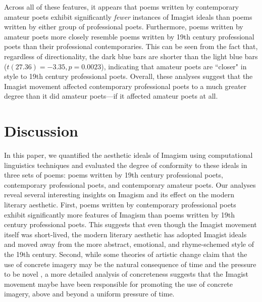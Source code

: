 \documentclass{book}
\begin{document}
Across all of these features, it appears that poems written by contemporary amateur poets exhibit significantly \emph{fewer} instances of Imagist ideals than poems written by either group of professional poets. Furthermore, poems written by amateur poets more closely resemble poems written by 19th century professional poets than their professional contemporaries. This can be seen from the fact that, regardless of directionality, the dark blue bars are shorter than the light blue bars ($t(27.36) = -3.35, p = 0.0023$), indicating that amateur poets are ``closer" in style to 19th century professional poets. Overall, these analyses suggest that the Imagist movement affected contemporary professional poets to a much greater degree than it did amateur poets---if it affected amateur poets at all.




\section{Discussion}
In this paper, we quantified the aesthetic ideals of Imagism using computational linguistics techniques and evaluated the degree of conformity to these ideals in three sets of poems: poems written by 19th century professional poets, contemporary professional poets, and contemporary amateur poets. Our analyses reveal several interesting insights on Imagism and its effect on the modern literary aesthetic. First, poems written by contemporary professional poets exhibit significantly more features of Imagism than poems written by 19th century professional poets. This suggests that even though the Imagist movement itself was short-lived, the modern literary aesthetic has adopted Imagist ideals and moved away from the more abstract, emotional, and rhyme-schemed style of the 19th century. Second, while some theories of artistic change claim that the use of concrete imagery may be the natural consequence of time and the pressure to be novel \citep{martindale1990clockwork}, a more detailed analysis of concreteness suggests that the Imagist movement maybe have been responsible for promoting the use of concrete imagery, above and beyond a uniform pressure of time. 
\end{document}
